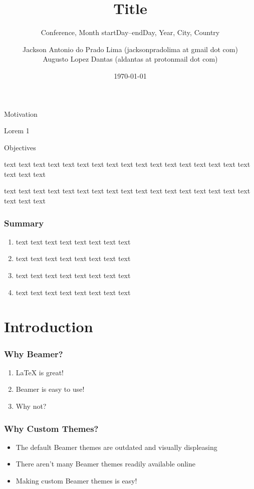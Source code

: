 \documentclass[aspectratio=169]{beamer}
\title{Title}
\author{Jackson Antonio do Prado Lima (jacksonpradolima at gmail dot com) \\  Augusto Lopez Dantas (aldantas at protonmail dot com)}
\date{\today}
\subtitle{\tiny{Conference, Month startDay--endDay, Year, City, Country}}
\begin{document}
	\frame{\titlepage}
	
	\begin{frame}{Motivation}
		\begin{block}{Lorem 1}
			\blindtext
		\end{block}
	\end{frame}
	
	\begin{frame}{Objectives}
		\begin{block}{text text text text}
			text text text text text text text text text text text text text text text text
		\end{block}
		\begin{block}{text text text text}
			text text text text text text text text text text text text text text text text
		\end{block}
	\end{frame}
	
	\begin{frame}
		\frametitle{Summary}
		\begin{enumerate}
			\item text text text text text text text text
			\item text text text text text text text text
			\item text text text text text text text text
			\item text text text text text text text text
		\end{enumerate}
	\end{frame}
	
	\startprogressbar
	
	\section{Introduction}
		\begin{frame}
			\frametitle{Why Beamer?}
			\begin{enumerate}
				\item LaTeX is great!
				\item Beamer is easy to use!
				\item Why not?
			\end{enumerate}
		\end{frame}

		\begin{frame}
			\frametitle{Why Custom Themes?}
			\begin{itemize}
				\item The default Beamer themes are outdated and visually displeasing
				\item There aren't many Beamer themes readily available online
				\item Making custom Beamer themes is easy!
			\end{itemize}
		\end{frame}
\end{document}
